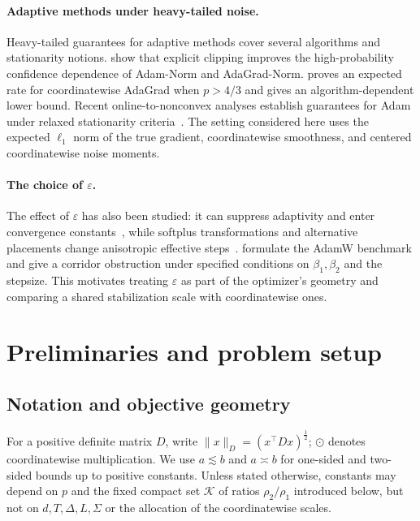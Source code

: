 \documentclass[11pt,letterpaper]{article}
\theoremstyle{definition}
\newcommand{\eps}{\varepsilon}
\begin{document}
\paragraph{Adaptive methods under heavy-tailed noise.}
Heavy-tailed guarantees for adaptive methods cover several algorithms and stationarity notions. \citet{chezhegov2025clipping} show that explicit clipping improves the high-probability confidence dependence of Adam-Norm and AdaGrad-Norm. \citet{liu2026adagrad} proves an expected rate for coordinatewise AdaGrad when $p>4/3$ and gives an algorithm-dependent lower bound. Recent online-to-nonconvex analyses establish guarantees for Adam under relaxed stationarity criteria~\citep{liu2026adam,pang2026adam}. The setting considered here uses the expected $\ell_1$ norm of the true gradient, coordinatewise smoothness, and centered coordinatewise noise moments.

\paragraph{The choice of \texorpdfstring{$\eps$}{epsilon}.}
The effect of $\eps$ has also been studied: it can suppress adaptivity and enter convergence constants~\citep{zaheer2018adaptive}, while softplus transformations and alternative placements change anisotropic effective steps~\citep{tong2022calibrating,yuan2020eadam}. \citet{yu2026openproblem} formulate the AdamW benchmark and give a corridor obstruction under specified conditions on $\beta_1,\beta_2$ and the stepsize. This motivates treating $\eps$ as part of the optimizer's geometry and comparing a shared stabilization scale with coordinatewise ones.

\section{Preliminaries and problem setup}
\label{sec:setup}

\subsection{Notation and objective geometry}

For a positive definite matrix $D$, write $\|x\|_D=(x^\top D x)^{\frac{1}{2}}$; $\odot$ denotes coordinatewise multiplication. We use $a\lesssim b$ and $a\asymp b$ for one-sided and two-sided bounds up to positive constants. Unless stated otherwise, constants may depend on $p$ and the fixed compact set $\mathcal K$ of ratios $\rho_2/\rho_1$ introduced below, but not on $d,T,\Delta,L,\Sigma$ or the allocation of the coordinatewise scales. 
\end{document}
